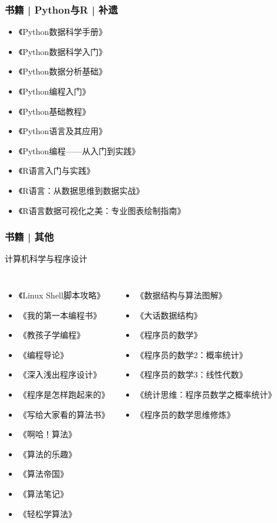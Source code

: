 \begin{frame}
  \frametitle{书籍 | Python与R | 补遗}
  \begin{itemize}
    \item 《Python数据科学手册》
    \item 《Python数据科学入门》
    \item 《Python数据分析基础》
    \item 《Python编程入门》
    \item 《Python基础教程》
    \item 《Python语言及其应用》
    \item 《Python编程——从入门到实践》
    \item 《R语言入门与实践》
    \item 《R语言：从数据思维到数据实战》
    \item 《R语言数据可视化之美：专业图表绘制指南》
  \end{itemize}
\end{frame}

\begin{frame}
  \frametitle{书籍 | 其他}
  \begin{block}{计算机科学与程序设计}
    \begin{columns}
    \begin{itemize}
      \item \alert{《Linux Shell脚本攻略》}
      \item 《我的第一本编程书》
      \item 《教孩子学编程》
      \item 《编程导论》
      \item 《深入浅出程序设计》
      \item 《程序是怎样跑起来的》
      \item 《写给大家看的算法书》
      \item 《啊哈！算法》
      \item 《算法的乐趣》
      \item 《算法帝国》
      \item 《算法笔记》
      \item 《轻松学算法》
    \end{itemize}
    \begin{itemize}
      \item 《数据结构与算法图解》
      \item 《大话数据结构》
      \item 《程序员的数学》
      \item 《程序员的数学2：概率统计》
      \item 《程序员的数学3：线性代数》
      \item 《统计思维：程序员数学之概率统计》
      \item 《程序员的数学思维修炼》
    \end{itemize}
  \end{columns}
  \end{block}
\end{frame}

